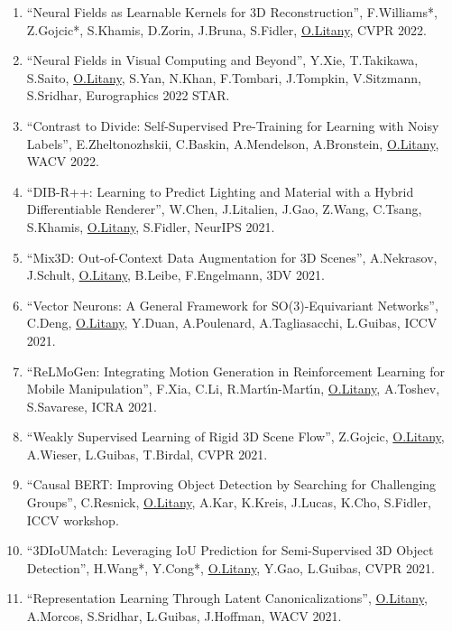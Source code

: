 \begin{enumerate}
\item ``Neural Fields as Learnable Kernels for 3D Reconstruction'', F.Williams*, Z.Gojcic*, S.Khamis, D.Zorin, J.Bruna, S.Fidler, \underline{O.Litany}, CVPR 2022.

\item ``Neural Fields in Visual Computing and Beyond'', Y.Xie, T.Takikawa, S.Saito, \underline{O.Litany}, S.Yan, N.Khan, F.Tombari, J.Tompkin, V.Sitzmann, S.Sridhar, Eurographics 2022 STAR.

\item ``Contrast to Divide: Self-Supervised Pre-Training for Learning with Noisy Labels'', E.Zheltonozhskii, C.Baskin, A.Mendelson, A.Bronstein, \underline{O.Litany}, WACV 2022.

\item ``DIB-R++: Learning to Predict Lighting and Material with a Hybrid Differentiable Renderer'', W.Chen, J.Litalien, J.Gao, Z.Wang, C.Tsang, S.Khamis, \underline{O.Litany}, S.Fidler, NeurIPS 2021.

\item ``Mix3D: Out-of-Context Data Augmentation for 3D Scenes'', A.Nekrasov, J.Schult, \underline{O.Litany}, B.Leibe, F.Engelmann, 3DV 2021.

\item ``Vector Neurons: A General Framework for {SO(3)}-Equivariant Networks'', C.Deng, \underline{O.Litany}, Y.Duan, A.Poulenard, A.Tagliasacchi, L.Guibas, ICCV 2021.

\item ``{ReLMoGen}: Integrating Motion Generation in Reinforcement Learning for Mobile Manipulation'', F.Xia, C.Li, R.Mart{\'\i}n-Mart{\'\i}n, \underline{O.Litany}, A.Toshev, S.Savarese, ICRA 2021.

\item ``Weakly Supervised Learning of Rigid 3D Scene Flow'', Z.Gojcic, \underline{O.Litany}, A.Wieser, L.Guibas, T.Birdal, CVPR 2021.

\item ``Causal {BERT}: Improving Object Detection by Searching for Challenging Groups'', C.Resnick, \underline{O.Litany}, A.Kar, K.Kreis, J.Lucas, K.Cho, S.Fidler, ICCV workshop.

\item ``3DIoUMatch: Leveraging IoU Prediction for Semi-Supervised 3D Object Detection'', H.Wang*, Y.Cong*, \underline{O.Litany}, Y.Gao, L.Guibas, CVPR 2021.

\item ``Representation Learning Through Latent Canonicalizations'', \underline{O.Litany}, A.Morcos, S.Sridhar, L.Guibas, J.Hoffman, WACV 2021.


\end{enumerate}
